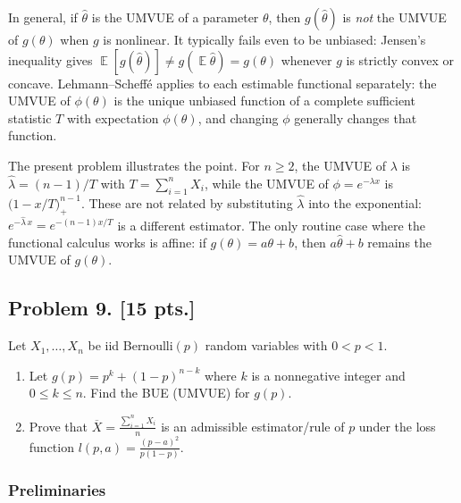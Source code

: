 \documentclass[11pt,a4paper]{article}
\DeclareMathOperator{\E}{\mathbb{E}}
\begin{document}
\begin{remark*}
In general, if \(\widehat\theta\) is the UMVUE of a parameter \(\theta\), then \(g(\widehat\theta)\) is \emph{not} the UMVUE of \(g(\theta)\) when \(g\) is nonlinear. It typically fails even to be unbiased: Jensen's inequality gives \(\E[g(\widehat\theta)]\neq g(\E\widehat\theta)=g(\theta)\) whenever \(g\) is strictly convex or concave. Lehmann--Scheff\'e applies to each estimable functional separately: the UMVUE of \(\phi(\theta)\) is the unique unbiased function of a complete sufficient statistic \(T\) with expectation \(\phi(\theta)\), and changing \(\phi\) generally changes that function.

The present problem illustrates the point. For \(n\ge 2\), the UMVUE of \(\lambda\) is \(\widehat\lambda=(n-1)/T\) with \(T=\sum_{i=1}^n X_i\), while the UMVUE of \(\phi=e^{-\lambda x}\) is \(\bigl(1-x/T\bigr)_+^{n-1}\). These are not related by substituting \(\widehat\lambda\) into the exponential: \(e^{-\widehat\lambda\, x}=e^{-(n-1)x/T}\) is a different estimator. The only routine case where the functional calculus works is affine: if \(g(\theta)=a\theta+b\), then \(a\widehat\theta+b\) remains the UMVUE of \(g(\theta)\).
\end{remark*}

\subsection{Problem 9. [15 pts.]}
Let \( X_1, \dots, X_n \) be iid Bernoulli\( (p) \) random variables with \( 0 < p < 1 \).
\begin{enumerate}[label=(\alph*)]
    \item Let \( g(p) = p^k + (1-p)^{n-k} \) where \( k \) is a nonnegative integer and \( 0 \le k \le n \). Find the BUE (UMVUE) for \( g(p) \).
    \item Prove that \( \overline{X} = \frac{\sum_{i=1}^n X_i}{n} \) is an admissible estimator/rule of \( p \) under the loss function \( l(p, a) = \frac{(p-a)^2}{p(1-p)} \).
\end{enumerate}

\setcounter{section}{9}
\setcounter{theorem}{0}
\setcounter{definition}{0}
\setcounter{remark}{0}
\setcounter{note}{0}

\subsubsection{Preliminaries}
\end{document}
